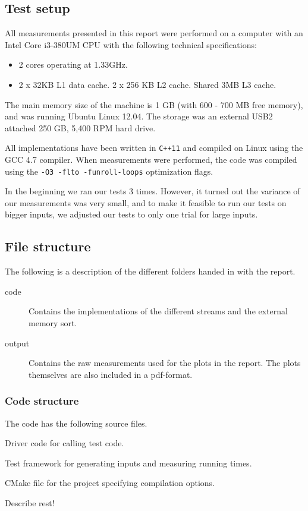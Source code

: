 \documentclass[a4paper,12pt]{article}
\begin{document}
\subsection{Test setup}
All measurements presented in this report were performed on a computer
with an Intel Core i3-380UM CPU with the following technical
specifications:
\begin{itemize}
\item 2 cores operating at 1.33GHz.
\item 2 x 32KB L1 data cache. 2 x 256 KB L2 cache. Shared 3MB L3 cache.
\end{itemize}
The main memory size of the machine is 1 GB (with 600 - 700 MB free memory), and was running Ubuntu
Linux 12.04. The storage was an external USB2 attached 250 GB, 5,400 RPM hard drive.

All implementations have been
written in \texttt{C++11} and compiled on Linux using the GCC 4.7 compiler. When measurements were performed, the
code was compiled using the \texttt{-O3 -flto -funroll-loops}
optimization flags.

In the beginning we ran our tests 3 times. However, it turned out the
variance of our measurements was very small, and to make it feasible
to run our tests on bigger inputs, we adjusted our tests to only
one trial for large inputs.

\subsection{File structure}
The following is a description of the different folders handed in with
the report.
\begin{description}
\item[code] Contains the implementations of the different streams and
  the external memory sort.

\item[output] Contains the raw measurements used for the plots in the
  report. The plots themselves are also included in a pdf-format.
\end{description}

\subsubsection{Code structure}
The code has the following source files.
\begin{description}
\item[main.cpp] Driver code for calling test code.
\item[Test.hpp] Test framework for generating inputs and measuring
  running times.
\item[CMakeLists.txt] CMake file for the project specifying
  compilation options.

\item Describe rest!
\end{description}
\end{document}
